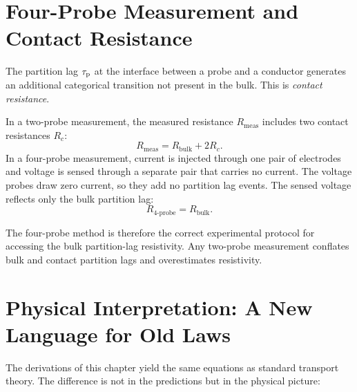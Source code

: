 \section{Four-Probe Measurement and Contact Resistance}
\label{sec:ch18-fourprobe}

The partition lag $\tau_{\mathrm{p}}$ at the interface between a probe and a conductor
generates an additional categorical transition not present in the bulk.
This is \emph{contact resistance}.

In a two-probe measurement, the measured resistance $R_{\mathrm{meas}}$
includes two contact resistances $R_c$:
\begin{equation}
  R_{\mathrm{meas}} = R_{\mathrm{bulk}} + 2R_c.
\end{equation}
In a four-probe measurement, current is injected through one pair of
electrodes and voltage is sensed through a separate pair that carries no
current.  The voltage probes draw zero current, so they add no partition
lag events.  The sensed voltage reflects only the bulk partition lag:
\begin{equation}
  R_{\mathrm{4\text{-}probe}} = R_{\mathrm{bulk}}.
\end{equation}

The four-probe method is therefore the correct experimental protocol for
accessing the bulk partition-lag resistivity.  Any two-probe measurement
conflates bulk and contact partition lags and overestimates resistivity.

\section{Physical Interpretation: A New Language for Old Laws}
\label{sec:ch18-interpretation}

The derivations of this chapter yield the same equations as standard
transport theory.  The difference is not in the predictions but in the
physical picture:

